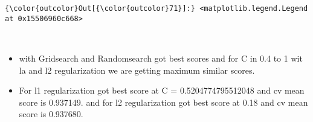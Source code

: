 \documentclass[11pt]{article}
\providecommand{\tightlist}{%
      \setlength{\itemsep}{0pt}\setlength{\parskip}{0pt}}
\begin{document}
\begin{Verbatim}[commandchars=\\\{\}]
{\color{outcolor}Out[{\color{outcolor}71}]:} <matplotlib.legend.Legend at 0x15506960c668>
\end{Verbatim}
            
    \begin{center}
    \end{center}
    { \hspace*{\fill} \\}
    
    \begin{itemize}
\tightlist
\item
  with Gridsearch and Randomsearch got best scores and for C in 0.4 to 1
  wit la and l2 regularization we are getting maximum similar scores.
\item
  For l1 regularization got best score at C = 0.5204774795512048 and cv
  mean score is 0.937149. and for l2 regularization got best score at
  0.18 and cv mean score is 0.937680.
\end{itemize}
\end{document}
